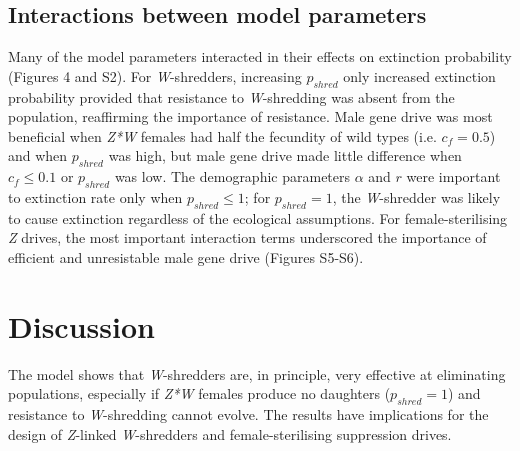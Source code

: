 \documentclass[]{rsos}%
\begin{document}
\hypertarget{interactions-between-model-parameters}{%
\subsection{Interactions between model
parameters}\label{interactions-between-model-parameters}}

Many of the model parameters interacted in their effects on extinction
probability (Figures 4 and S2). For \emph{W}-shredders, increasing
\(p_{shred}\) only increased extinction probability provided that
resistance to \emph{W}-shredding was absent from the population,
reaffirming the importance of resistance. Male gene drive was most
beneficial when \emph{Z*W} females had half the fecundity of wild types
(i.e. \(c_f = 0.5\)) and when \(p_{shred}\) was high, but male gene
drive made little difference when \(c_f \le 0.1\) or \(p_{shred}\) was
low. The demographic parameters \(\alpha\) and \(r\) were important to
extinction rate only when \(p_{shred} \le 1\); for \(p_{shred} = 1\),
the \emph{W}-shredder was likely to cause extinction regardless of the
ecological assumptions. For female-sterilising \emph{Z} drives, the most
important interaction terms underscored the importance of efficient and
unresistable male gene drive (Figures S5-S6).

\hypertarget{discussion}{%
\section{Discussion}\label{discussion}}

The model shows that \emph{W}-shredders are, in principle, very
effective at eliminating populations, especially if \emph{Z*W} females
produce no daughters (\(p_{shred} = 1\)) and resistance to
\emph{W}-shredding cannot evolve. The results have implications for the
design of \emph{Z}-linked \emph{W}-shredders and female-sterilising
suppression drives.
\end{document}

